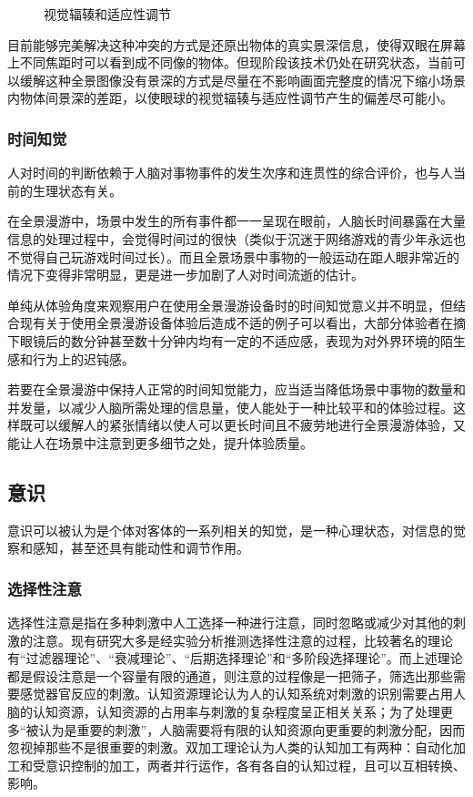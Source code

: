 \begin{figure}[htp]
\centering
{}
\caption{视觉辐辏和适应性调节}
\label{fig:binocular_disparity}
\end{figure}

目前能够完美解决这种冲突的方式是还原出物体的真实景深信息，使得双眼在屏幕上不同焦距时可以看到成不同像的物体。但现阶段该技术仍处在研究状态，当前可以缓解这种全景图像没有景深的方式是尽量在不影响画面完整度的情况下缩小场景内物体间景深的差距，以使眼球的视觉辐辏与适应性调节产生的偏差尽可能小。

\subsubsection{时间知觉}
人对时间的判断依赖于人脑对事物事件的发生次序和连贯性的综合评价，也与人当前的生理状态有关。

在全景漫游中，场景中发生的所有事件都一一呈现在眼前，人脑长时间暴露在大量信息的处理过程中，会觉得时间过的很快（类似于沉迷于网络游戏的青少年永远也不觉得自己玩游戏时间过长）。而且全景场景中事物的一般运动在距人眼非常近的情况下变得非常明显，更是进一步加剧了人对时间流逝的估计。

单纯从体验角度来观察用户在使用全景漫游设备时的时间知觉意义并不明显，但结合现有关于使用全景漫游设备体验后造成不适的例子可以看出，大部分体验者在摘下眼镜后的数分钟甚至数十分钟内均有一定的不适应感，表现为对外界环境的陌生感和行为上的迟钝感。

若要在全景漫游中保持人正常的时间知觉能力，应当适当降低场景中事物的数量和并发量，以减少人脑所需处理的信息量，使人能处于一种比较平和的体验过程。这样既可以缓解人的紧张情绪以使人可以更长时间且不疲劳地进行全景漫游体验，又能让人在场景中注意到更多细节之处，提升体验质量。

\subsection{意识}
意识可以被认为是个体对客体的一系列相关的知觉，是一种心理状态，对信息的觉察和感知，甚至还具有能动性和调节作用。

\subsubsection{选择性注意}
选择性注意是指在多种刺激中人工选择一种进行注意，同时忽略或减少对其他的刺激的注意。现有研究大多是经实验分析推测选择性注意的过程，比较著名的理论有“过滤器理论”、“衰减理论”、“后期选择理论”和“多阶段选择理论”。而上述理论都是假设注意是一个容量有限的通道，则注意的过程像是一把筛子，筛选出那些需要感觉器官反应的刺激。认知资源理论认为人的认知系统对刺激的识别需要占用人脑的认知资源，认知资源的占用率与刺激的复杂程度呈正相关关系；为了处理更多“被认为是重要的刺激”，人脑需要将有限的认知资源向更重要的刺激分配，因而忽视掉那些不是很重要的刺激。双加工理论认为人类的认知加工有两种：自动化加工和受意识控制的加工，两者并行运作，各有各自的认知过程，且可以互相转换、影响。

